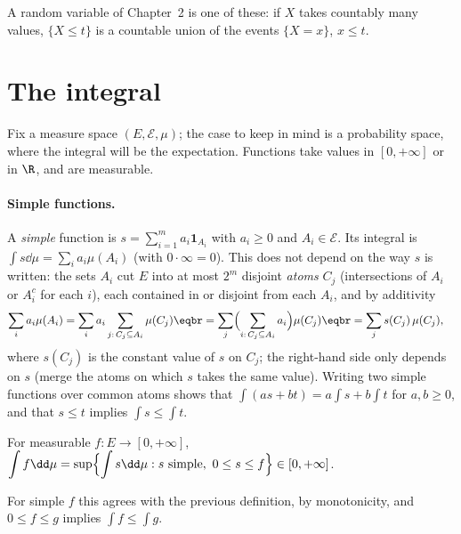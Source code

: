 A random variable of Chapter~2 is one of these: if $X$ takes countably many values, $\{X\le t\}$ is a countable union of the
events $\{X=x\}$, $x\le t$.

\section{The integral}\label{sec:integral}

Fix a measure space $(E,\mathcal E,\mu)$; the case to keep in mind is a probability space, where the integral will be the
expectation. Functions take values in $[0,+\infty]$ or in $\R$, and are measurable.

\paragraph{Simple functions.} A \emph{simple} function is $s=\sum_{i=1}^ma_i\mathbf 1_{A_i}$ with $a_i\ge0$ and $A_i\in\mathcal E$. Its integral is
$\int s\dd\mu=\sum_ia_i\mu(A_i)$ (with $0\cdot\infty=0$). This does not depend on the way $s$ is written: the sets $A_i$ cut $E$ into at
most $2^m$ disjoint \emph{atoms} $C_j$ (intersections of $A_i$ or $A_i^c$ for each $i$), each contained in or disjoint from each $A_i$, and
by additivity
\[
\begin{aligned}\sum_ia_i\mu(A_i)&=\sum_ia_i\sum_{j:\,C_j\subseteq A_i}\mu(C_j)\eqbr=\sum_j\Bigl(\sum_{i:\,C_j\subseteq A_i}a_i\Bigr)\mu(C_j)\eqbr=\sum_js(C_j)\,\mu(C_j),\end{aligned}
\]
where $s(C_j)$ is the constant value of $s$ on $C_j$; the right-hand side only depends on $s$ (merge the atoms on which $s$ takes the
same value). Writing two simple functions over common atoms shows that $\int(as+bt)=a\int s+b\int t$ for $a,b\ge0$, and that
$s\le t$ implies $\int s\le\int t$.

\begin{definition}
For measurable $f:E\to[0,+\infty]$, $\displaystyle\int f\dd\mu=\sup\Bigl\{\int s\dd\mu:s\text{ simple},\ 0\le s\le f\Bigr\}\in[0,+\infty]$.
\end{definition}

For simple $f$ this agrees with the previous definition, by monotonicity, and $0\le f\le g$ implies $\int f\le\int g$.

